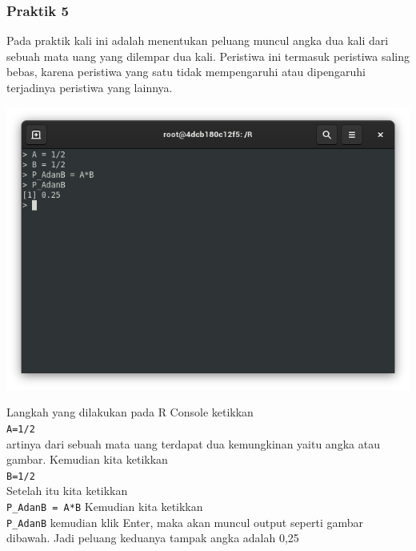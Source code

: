 \documentclass[a4paper,12pt]{article}
\begin{document}
\subsubsection{Praktik 5}
Pada praktik kali ini adalah menentukan peluang muncul angka dua kali dari sebuah mata uang yang dilempar dua kali. Peristiwa ini termasuk peristiwa saling bebas, karena peristiwa yang satu tidak mempengaruhi atau dipengaruhi terjadinya peristiwa yang lainnya.
\begin{center}
	\includegraphics[scale=.5]{prak5}
\end{center}
Langkah yang dilakukan pada R Console ketikkan \\
\texttt{A=1/2 }\\
artinya dari sebuah mata uang terdapat dua kemungkinan yaitu angka atau gambar. Kemudian kita ketikkan\\ 
\texttt{B=1/2}\\ 
Setelah itu kita ketikkan\\ 
\texttt{P\_AdanB = A*B}
Kemudian kita ketikkan\\ 
\texttt{P\_AdanB} kemudian klik Enter, maka akan muncul output seperti gambar dibawah. Jadi peluang keduanya tampak angka adalah 0,25
\end{document}
